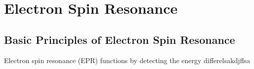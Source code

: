 

\section{Electron Spin Resonance}

\subsection{Basic Principles of Electron Spin Resonance}

Electron spin resonance (EPR) functions by detecting the energy differelsakdjflsa
